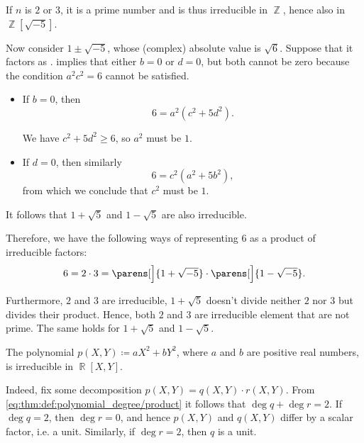 \begin{example}
\begin{thmenum}
    If \( n \) is \( 2 \) or \( 3 \), it is a prime number and is thus irreducible in \( \BbbZ \), hence also in \( \BbbZ[\sqrt{-5}] \).

    Now consider \( 1 \pm \sqrt{-5} \), whose (complex) absolute value is \( \sqrt 6 \). Suppose that it factors as .  implies that either \( b = 0 \) or \( d = 0 \), but both cannot be zero because the condition \( a^2 c^2 = 6 \) cannot be satisfied.
    \begin{itemize}
      \item If \( b = 0 \), then
      \begin{equation*}
        6 = a^2 (c^2 + 5 d^2).
      \end{equation*}

      We have \( c^2 + 5 d^2 \geq 6 \), so \( a^2 \) must be \( 1 \).

      \item If \( d = 0 \), then similarly
      \begin{equation*}
        6 = c^2 (a^2 + 5b^2),
      \end{equation*}
      from which we conclude that \( c^2 \) must be \( 1 \).
    \end{itemize}

    It follows that \( 1 + \sqrt{5} \) and \( 1 - \sqrt{5} \) are also irreducible.

    Therefore, we have the following ways of representing \( 6 \) as a product of irreducible factors:
    \begin{equation*}
      6 = 2 \cdot 3 = \parens[\Big]{ 1 + \sqrt{-5} } \cdot \parens[\Big]{ 1 - \sqrt{-5}}.
    \end{equation*}

    Furthermore, \( 2 \) and \( 3 \) are irreducible, \( 1 + \sqrt{5} \) doesn't divide neither \( 2 \) nor \( 3 \) but divides their product. Hence, both \( 2 \) and \( 3 \) are irreducible element that are not prime. The same holds for \( 1 + \sqrt{5} \) and \( 1 - \sqrt{5} \).

     The polynomial \( p(X, Y) \coloneqq a X^2 + b Y^2 \), where \( a \) and \( b \) are positive real numbers, is irreducible in \( \BbbR[X, Y] \).

    Indeed, fix some decomposition \( p(X, Y) = q(X, Y) \cdot r(X, Y) \). From \eqref{eq:thm:def:polynomial_degree/product} it follows that \( \deg q + \deg r = 2 \). If \( \deg q = 2 \), then \( \deg r = 0 \), and hence \( p(X, Y) \) and \( q(X, Y) \) differ by a scalar factor, i.e. a unit. Similarly, if \( \deg r = 2 \), then \( q \) is a unit.


\end{thmenum}
\end{example}
